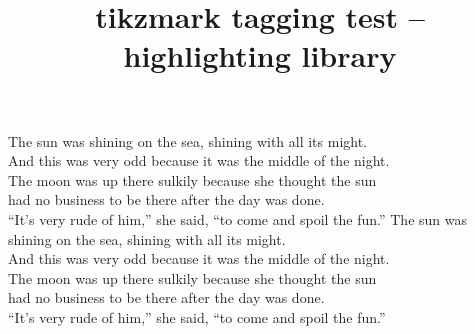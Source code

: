 \documentclass{article}
\title{tikzmark tagging test -- highlighting library}
\begin{document}
The sun was shining on the sea, shining with all its might. \\
\StartHighlighting[fill=cyan!50]%
And this was very odd because it was the middle of the night. \\
\StopHighlighting%
The moon was up there sulkily because she thought the sun \\
had no business to be there after the day was done. \\
\StartHighlighting[fill=magenta!50,direction=vertical]%
``It's very rude of him,'' she said, ``to come and spoil the fun.''
\StopHighlighting%
\noindent The sun was shining on the sea, shining with all its
might. \\
And this was very odd because it was the middle of the night. \\
\StartHighlighting[fill=yellow!50,direction=box]%
The moon was up there sulkily because she thought the sun \\
had no business to be there after the day was
done\StopHighlighting. \\
``It's very rude of him,'' she said, ``to come and spoil the fun.''
\end{document}
